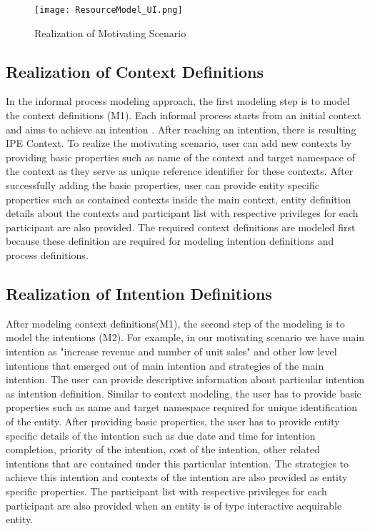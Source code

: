 \begin{figure}
	\centering
	\texttt{[image: ResourceModel\_UI.png]}
	\caption{Realization of Motivating Scenario}
	\label{fig:realizationofmotivatingscenario}
\end{figure}

\subsection{Realization of Context Definitions}
In the informal process modeling approach, the first modeling step is to model the context definitions (M1). Each informal process starts from an initial context and aims to achieve an intention \cite{Sungur2014a}. After reaching an intention, there is resulting IPE Context. To realize the motivating scenario, user can add new contexts by providing basic properties such as name of the context and target namespace of the context as they serve as unique reference identifier for these contexts. After successfully adding the basic properties, user can provide entity specific properties such as contained contexts inside the main context, entity definition details about the contexts and participant list with respective privileges for each participant are also provided. The required context definitions are modeled first because these definition are required for modeling intention definitions and process definitions.  

\subsection{Realization of Intention Definitions}
After modeling context definitions(M1), the second step of the modeling is to model the intentions (M2). For example, in our motivating scenario we have main intention as "increase revenue and number of unit sales" and other low level intentions that emerged out of main intention and strategies of the main intention. The user can provide descriptive information about particular intention as intention definition. Similar to context modeling, the user has to provide basic properties such as name and target namespace required for unique identification of the entity. After providing basic properties, the user has to provide entity specific details of the intention such as due date and time for intention completion, priority of the intention, cost of the intention, other related intentions that are contained under this particular intention. The strategies to achieve this intention and contexts of the intention are also provided as entity specific properties. The participant list with respective privileges for each participant are also provided when an entity is of type interactive acquirable entity. 

